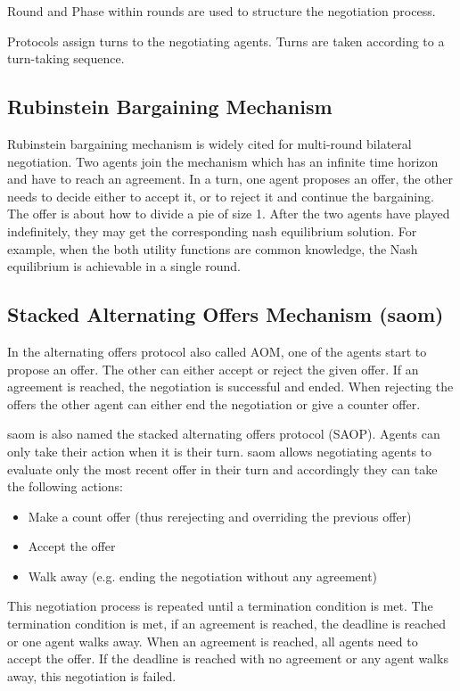\begin{definition}
Round and Phase within rounds are used to structure the negotiation process.
\end{definition}

\begin{definition}
Protocols assign turns to the negotiating agents. Turns are taken according to a turn-taking sequence.
\end{definition}

\subsection{Rubinstein Bargaining Mechanism}
Rubinstein bargaining mechanism is widely cited for multi-round bilateral negotiation\parencite{Baarslag2014, Mohammad2021, 10.1007/3-540-45448-9_28}.
Two agents join the mechanism which has an infinite time horizon and have to reach an agreement. In a turn, one agent proposes an offer, the other needs to decide either to accept it, or to reject it and continue the bargaining\parencite{Rubinstein1982}. The offer is about how to divide a pie of size 1. After the two agents have played indefinitely, they may get the corresponding nash equilibrium solution. For example, when the both utility functions are common knowledge, the Nash equilibrium is achievable in a single round.

\subsection{Stacked Alternating Offers Mechanism (\gls{saom})} \label{background:saom}
In the alternating offers protocol also called AOM, one of the agents start to propose an offer. The other can either accept or reject the given offer. If an agreement is reached, the negotiation is successful and ended. When rejecting the offers the other agent can either end the negotiation or give a counter offer.

\gls{saom} is also named the stacked alternating offers protocol (SAOP)\parencite{Aydoğan2017}. Agents can only take their action when it is their turn. \gls{saom} allows negotiating agents to evaluate only the most recent offer in their turn and accordingly they can take the following actions:
\begin{itemize}
\item Make a count offer (thus rerejecting and overriding the previous offer)
\item Accept the offer
\item Walk away (e.g. ending the negotiation without any agreement)
\end{itemize}
This negotiation process is repeated until a termination condition is met. The termination condition is met, if an agreement is reached, the deadline is reached or one agent walks away. When an agreement is reached, all agents need to accept the offer. If the deadline is reached with no agreement or any agent walks away, this negotiation is failed. 

